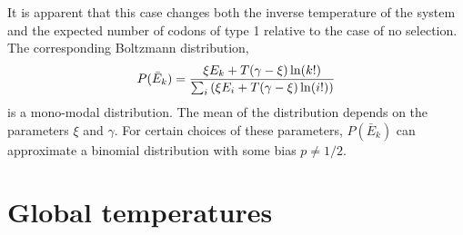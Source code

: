 \documentclass[a4paper,10pt]{paper}%
\begin{document}
%
%   
It is apparent  that this case changes both the inverse temperature of the system and the expected number of codons of type 1 relative to the case of no selection.  The corresponding Boltzmann distribution,
%
% 
\begin{equation}
P(\bar E_k) = { \xi E_k + T(\gamma -\xi)\ln(k!)\over \sum_i  \left(\xi E_i + T(\gamma -\xi)\ln(i!)\right)}
\end{equation}
%
% 
 is a mono-modal distribution. The mean of the distribution depends on the parameters $\xi$ and $\gamma$. For certain choices of  these parameters, $P(\bar E_k)$ can approximate a binomial distribution with some bias $p\neq 1/2$. 


\section{Global temperatures}
\end{document}
